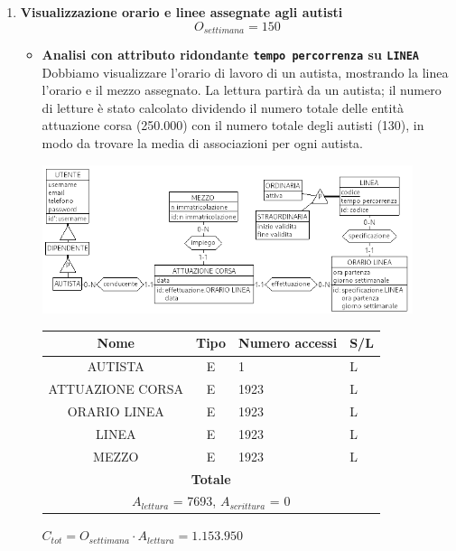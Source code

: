 \documentclass[12pt,a4paper]{report}
\begin{document}
\begin{enumerate}[label=\textbf{\arabic*)}]
         \item \textbf{Visualizzazione orario e linee assegnate agli autisti} \label{op4} \\
            \[ {O_{settimana} = 150} \]
           \begin{itemize}
            \item \textbf{Analisi con attributo ridondante \texttt{tempo percorrenza} su \texttt{LINEA}} \\
            Dobbiamo visualizzare l'orario di lavoro di un autista, mostrando la linea l'orario e il mezzo assegnato.
            La lettura partirà da un autista; il numero di letture è stato calcolato dividendo il numero totale delle entità attuazione corsa (250.000) con il numero totale degli autisti (130), in modo da trovare la media di associazioni per ogni autista.
            \begin{center}
	        \includegraphics[width=0.9\textwidth]{op_4_RID}
	        \end{center}
            \begin{table}[H]
            \centering
            \begin{tabular}{|c|c|l|l|}
            \hline
            \textbf{Nome} & \textbf{Tipo} & \textbf{Numero accessi} & \textbf{S/L} \\
            \hline
            AUTISTA & E & 1 & L \\
            \hline
            ATTUAZIONE CORSA & E & 1923 & L \\
            \hline
            ORARIO LINEA & E & 1923 & L \\
            \hline
            LINEA & E & 1923 & L \\
            \hline
            MEZZO & E & 1923 & L \\
            \hline
            \multicolumn{4}{c}{\textbf{Totale}} \\
            \multicolumn{4}{c}{${A_{lettura}}$ = 7693, ${A_{scrittura}}$ = 0} \\
            \hline
            \end{tabular}
            \end{table}
            \begin{center}
            ${C_{tot} = {O_{settimana}}\cdot {A_{lettura}} =1.153.950}$
            \end{center}


\end{itemize}
\end{enumerate}
\end{document}
